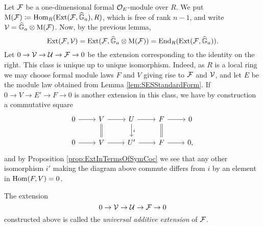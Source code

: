 \documentclass[../main.tex]{subfiles}
\begin{document}
Let $\mathcal{F}$ be a one-dimensional formal ${\mathcal{O}_E}$-module over $R$.
We put $\mathrm M(\mathcal{F}) \coloneqq \operatorname{Hom}_R(\operatorname{Ext}(\mathcal{F}, \widehat{\mathbb{G}}_a), R)$, which is free of
rank $n-1$, and
write $\mathcal{V} = \widehat{\mathbb{G}}_a \otimes \mathrm M(\mathcal{F})$. Now, by the previous lemma,
\begin{equation*}
  \operatorname{Ext}(\mathcal{F},\mathcal{V}) = \operatorname{Ext}(\mathcal{F}, \widehat{\mathbb{G}}_a \otimes \mathrm M(\mathcal{F})) = \operatorname{End}_R(\operatorname{Ext}(\mathcal{F}, \widehat{\mathbb{G}}_a)). 
\end{equation*}
Let $0 \to \mathcal{V} \to \mathcal{U} \to \mathcal{F} \to 0$ be the extension corresponding to the identity 
on the right. This class is unique up to unique isomorphism. Indeed, 
as $R$ is a local ring we may choose formal module laws $F$ and $V$ giving rise
to $\mathcal{F}$ and $\mathcal{V}$, and let $E$ be the module law obtained from 
Lemma \ref{lem:SESStandardForm}. 
If $0 \to V \to E' \to F \to 0$ is another extension in this class, we
have by construction a commutative square
\begin{equation*}
\begin{tikzcd}[ampersand replacement=\&]
	0 \& {V} \& U \& F \& 0 \\
	0 \& {V} \& {U'} \& F \& 0,
	\arrow[from=1-1, to=1-2]
	\arrow[from=1-2, to=1-3]
	\arrow[Rightarrow, no head, from=1-2, to=2-2]
	\arrow[from=1-3, to=1-4]
	\arrow["i", from=1-3, to=2-3]
	\arrow[from=1-4, to=1-5]
	\arrow[Rightarrow, no head, from=1-4, to=2-4]
	\arrow[from=2-1, to=2-2]
	\arrow[from=2-2, to=2-3]
	\arrow[from=2-3, to=2-4]
	\arrow[from=2-4, to=2-5]
\end{tikzcd}
\end{equation*}
and by Proposition \ref{prop:ExtInTermsOfSymCoc} we see that 
any other isomorphism $i'$ making the diagram above commute differs from
$i$ by an element in $\operatorname{Hom}(F, V) = 0$. 

\begin{defi}
  The extension
  \begin{equation*}
    0 \to \mathcal{V} \to \mathcal{U} \to \mathcal{F} \to 0
  \end{equation*}
  constructed above is called the \emph{universal additive extension} of $\mathcal{F}$.
\end{defi}
\end{document}
